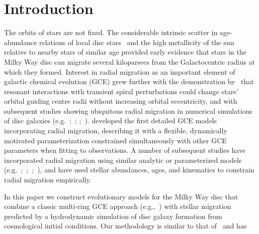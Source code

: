 \documentclass[draft2.tex]{subfiles}
\begin{document}
 

\section{Introduction} 
\label{sec:intro} 

The orbits of stars are not fixed. The considerable intrinsic scatter in 
age-abundance relations of local disc stars~\citep{Edvardsson1993} and the high 
metallicity of the sun relative to nearby stars of similar age 
\citep*{Wielen1996} provided early evidence that stars in the Milky Way disc 
can migrate several kiloparsecs from the Galactocentric radius at which they 
formed. 
Interest in radial migration as an important element of galactic chemical 
evolution (GCE) grew further with the demonstration by~\citet{Sellwood2002} 
that resonant interactions with transient spiral perturbations could 
change stars' orbital guiding centre radii without increasing orbital 
eccentricity, and with subsequent studies showing ubiquitous radial migration 
in numerical simulations of disc galaxies (e.g.~\citealp{Roskar2008a, 
Roskar2008b, Loebman2011, Minchev2011};~\citealp*{Bird2012}; 
\citealp{Bird2013};~\citealp*{Grand2012a, Grand2012b, Kubryk2013}). 
\citet{Schoenrich2009a,Schoenrich2009b} developed the first detailed GCE 
models incorporating radial migration, describing it with a flexible, 
dynamically motivated parameterization constrained simultaneously with other 
GCE parameters when fitting to observations. A number of subsequent studies 
have incorporated radial migration using similar analytic or parameterized 
models (e.g.~\citealp{Bilitewski2012, Hayden2015};~\citealp*{Kubryk2015a, 
Kubryk2015b};~\citealp{Feuillet2018};~\citealp*{Sharma2020}), and 
\citet{Frankel2018, Frankel2019, Frankel2020} have used stellar abundances, 
ages, and kinematics to constrain radial migration empirically. 
\par 
In this paper we construct evolutionary models for the Milky Way disc that 
combine a classic multi-ring GCE approach (e.g.,~\citealp{Matteucci1989, 
Wyse1989, Prantzos1995}) with stellar migration predicted by a 
hydrodynamic simulation of disc galaxy formation from cosmological initial 
conditions. 
Our methodology is similar to that of~\citet*{Minchev2013, Minchev2014} and has 
\end{document}
